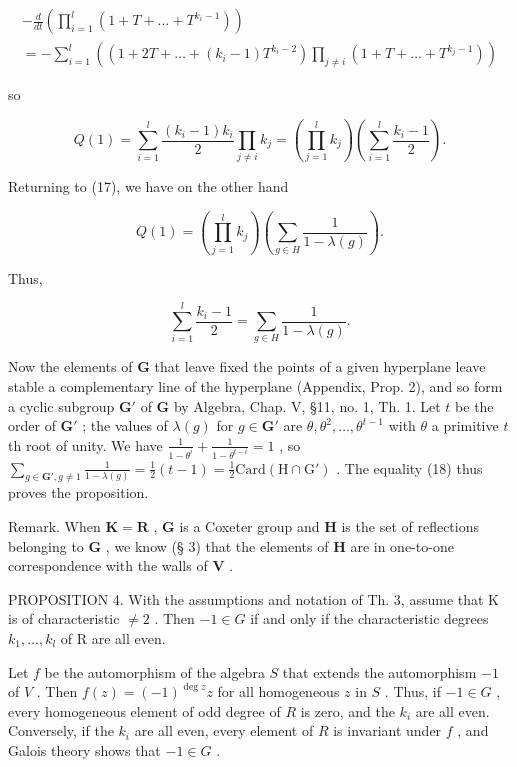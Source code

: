 \[
\begin{array}{l} - \frac {d}{d t} \left(\prod_ {i = 1} ^ {l} (1 + T + \dots + T ^ {k _ {i} - 1})\right) \\ = - \sum_ {i = 1} ^ {l} \left((1 + 2 T + \dots + (k _ {i} - 1) T ^ {k _ {i} - 2}) \prod_ {j \neq i} (1 + T + \dots + T ^ {k _ {j} - 1})\right) \end{array}
\]

so

\[
Q (1) = \sum_ {i = 1} ^ {l} \frac {\left(k _ {i} - 1\right) k _ {i}}{2} \prod_ {j \neq i} k _ {j} = \left(\prod_ {j = 1} ^ {l} k _ {j}\right) \left(\sum_ {i = 1} ^ {l} \frac {k _ {i} - 1}{2}\right).
\]

Returning to (17), we have on the other hand

\[
Q (1) = \left(\prod_ {j = 1} ^ {l} k _ {j}\right) \left(\sum_ {g \in H} \frac {1}{1 - \lambda (g)}\right).
\]

Thus,

\[
\sum_ {i = 1} ^ {l} \frac {k _ {i} - 1}{2} = \sum_ {g \in H} \frac {1}{1 - \lambda (g)}.\tag{18}
\]

Now the elements of \(\mathbf{G}\) that leave fixed the points of a given hyperplane leave stable a complementary line of the hyperplane (Appendix, Prop. 2), and so form a cyclic subgroup \(\mathbf{G}'\) of \(\mathbf{G}\) by Algebra, Chap. V, §11, no. 1, Th. 1. Let \(t\) be the order of \(\mathbf{G}'\) ; the values of \(\lambda(g)\) for \(g \in \mathbf{G}'\) are \(\theta, \theta^2, \ldots, \theta^{t-1}\) with \(\theta\) a primitive \(t\) th root of unity. We have \(\frac{1}{1-\theta^i} + \frac{1}{1-\theta^{t-i}} = 1\) , so \(\sum_{g \in \mathbf{G}', g \neq 1} \frac{1}{1-\lambda(g)} = \frac{1}{2}(t-1) = \frac{1}{2}\mathrm{Card}(\mathrm{H} \cap \mathrm{G}')\) . The equality (18) thus proves the proposition.

Remark. When \(\mathbf{K} = \mathbf{R}\) , \(\mathbf{G}\) is a Coxeter group and \(\mathbf{H}\) is the set of reflections belonging to \(\mathbf{G}\) , we know (§ 3) that the elements of \(\mathbf{H}\) are in one-to-one correspondence with the walls of \(\mathbf{V}\) .

PROPOSITION 4. With the assumptions and notation of Th. 3, assume that K is of characteristic \(\neq 2\) . Then \(-1 \in G\) if and only if the characteristic degrees \(k_{1}, \ldots, k_{l}\) of R are all even.

Let \(f\) be the automorphism of the algebra \(S\) that extends the automorphism \(-1\) of \(V\) . Then \(f(z) = (-1)^{\deg z}z\) for all homogeneous \(z\) in \(S\) . Thus, if \(-1 \in G\) , every homogeneous element of odd degree of \(R\) is zero, and the \(k_i\) are all even. Conversely, if the \(k_i\) are all even, every element of \(R\) is invariant under \(f\) , and Galois theory shows that \(-1 \in G\) .

